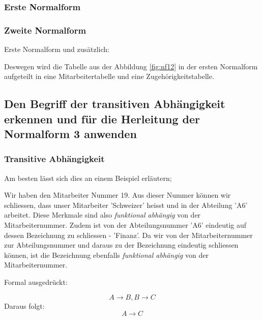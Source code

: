 \subsubsection{Erste Normalform}

\begin{center}
\end{center}

\subsubsection{Zweite Normalform}
Erste Normalform und zusätzlich:

\begin{center}
\end{center}

Deswegen wird die Tabelle aus der Abbildung \ref{fig:nf12} in der ersten Normalform aufgeteilt in eine Mitarbeitertabelle und eine Zugehörigkeitstabelle.

\subsection{Den Begriff der transitiven Abhängigkeit erkennen und für die Herleitung der Normalform 3 anwenden}

\subsubsection{Transitive Abhängigkeit}
Am besten lässt sich dies an einem Beispiel erläutern;


Wir haben den Mitarbeiter Nummer 19. Aus dieser Nummer können wir schliessen, dass unser Mitarbeiter 'Schweizer' heisst und in der Abteilung 'A6' arbeitet. Diese Merkmale sind also \emph{funktional abhängig} von der Mitarbeiternummer. Zudem ist von der Abteilungsnummer 'A6' eindeutig auf dessen Bezeichnung zu schliessen - 'Finanz'. Da wir von der Mitarbeiternummer zur Abteilungsnummer und daraus zu der Bezeichnung eindeutig schliessen können, ist die Bezeichnung ebenfalls \emph{funktional abhängig} von der Mitarbeiternummer.

Formal ausgedrückt:

\begin{equation*}
    A\rightarrow B , B\rightarrow C
\end{equation*}
Daraus folgt:
\begin{equation*}
    A\rightarrow C
\end{equation*}

